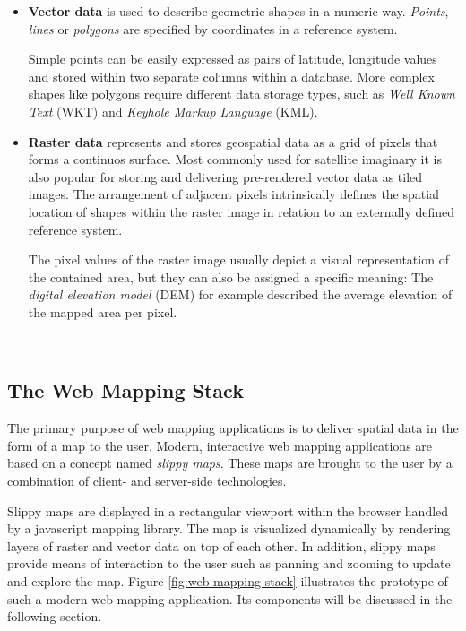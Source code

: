 \begin{itemize}

\item \textbf{Vector data} is used to describe geometric shapes in a numeric way. \textit{Points}, \textit{lines} or \textit{polygons} are specified by coordinates in a reference system.

Simple points can be easily expressed as pairs of latitude, longitude values and stored within two separate columns within a database. More complex shapes like polygons require different data storage types, such as \textit{Well Known Text} (WKT) and \textit{Keyhole Markup Language} (KML).

\item \textbf{Raster data} represents and stores geospatial data as a grid of pixels that forms a continuos surface. Most commonly used for satellite imaginary it is also popular for storing and delivering pre-rendered vector data as tiled images. The arrangement of adjacent pixels intrinsically defines the spatial location of shapes within the raster image in relation to an externally defined reference system.

The pixel values of the raster image usually depict a visual representation of the contained area, but they can also be assigned a specific meaning: The \textit{digital elevation model} (DEM) for example described the average elevation of the mapped area per pixel.

\end{itemize}

~\cite{Kupper2005lbs, Zzolo11mappingdrupal}

\subsection{The Web Mapping Stack}

The primary purpose of web mapping applications is to deliver spatial data in the form of a map to the user. Modern, interactive web mapping applications are based on a concept named \textit{slippy maps}. These maps are brought to the user by a combination of client- and server-side technologies. 

Slippy maps are displayed in a rectangular viewport within the browser handled by a javascript mapping library. The map is visualized dynamically by rendering layers of raster and vector data on top of each other. In addition, slippy maps provide means of interaction to the user such as panning and zooming to update and explore the map. Figure \ref{fig:web-mapping-stack} illustrates the prototype of such a modern web mapping application. Its components will be discussed in the following section.

